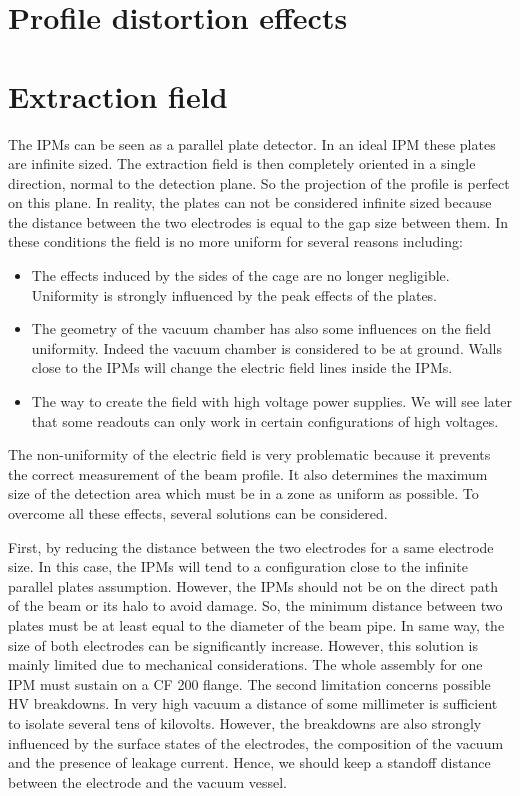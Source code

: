 \begin{refsection}
	\section{Profile distortion effects}

  \section{Extraction field}
  The IPMs can be seen as a parallel plate detector. In an ideal IPM these plates are infinite sized. The extraction field is then completely oriented in a single direction, normal to the detection plane. So the projection of the profile is perfect on this plane. In reality, the plates can not be considered infinite sized because the distance between the two electrodes is equal to the gap size between them. In these conditions the field is no more uniform for several reasons including:
  \begin{itemize}
    \item The effects induced by the sides of the cage are no longer negligible. Uniformity is strongly influenced by the peak effects of the plates.
    \item The geometry of the vacuum chamber has also some influences on the field uniformity. Indeed the vacuum chamber is considered to be at ground. Walls close to the IPMs will change the electric field lines inside the IPMs.
    \item The way to create the field with high voltage power supplies. We will see later that some readouts can only work in certain configurations of high voltages.
  \end{itemize}
  The non-uniformity of the electric field is very problematic because it prevents the correct measurement of the beam profile. It also determines the maximum size of the detection area which must be in a zone as uniform as possible. To overcome all these effects, several solutions can be considered.
  
  First, by reducing the distance between the two electrodes for a same electrode size. In this case, the IPMs will tend to a configuration close to the infinite parallel plates assumption. However, the IPMs should not be on the direct path of the beam or its halo to avoid damage. So, the minimum distance between two plates must be at least equal to the diameter of the beam pipe. In same way, the size of both electrodes can be significantly increase. However, this solution is mainly limited due to mechanical considerations. The whole assembly for one IPM must sustain on a CF 200 flange. The second limitation concerns possible HV breakdowns. In very high vacuum a distance of some millimeter is sufficient to isolate several tens of kilovolts. However, the breakdowns are also strongly influenced by the surface states of the electrodes, the composition of the vacuum and the presence of leakage current. Hence, we should keep a standoff distance between the electrode and the vacuum vessel.


\end{refsection}
